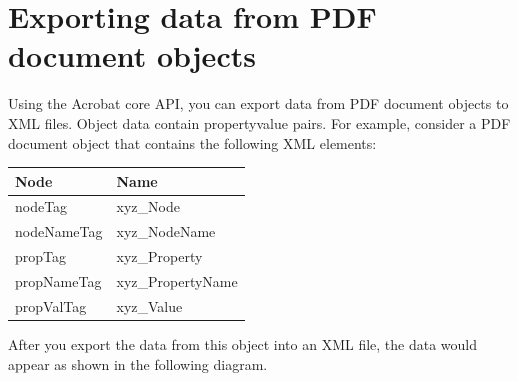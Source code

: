 \documentclass[letterpaper,12pt,english,openany,oneside]{sphinxmanual}
\begin{document}
\section{Exporting data from PDF document objects}
\label{\detokenize{Plugins_Pimech:exporting-data-from-pdf-document-objects}}
Using the Acrobat core API, you can export data from PDF document objects to XML files. Object data contain property\sphinxhyphen{}value pairs. For example, consider a PDF document object that contains the following XML elements:


\begin{savenotes}\sphinxattablestart
\centering
{}\label{\detokenize{Plugins_Pimech:section-1}}\nobreak
\begin{tabulary}{\linewidth}[t]{|T|T|}
\hline
\sphinxstyletheadfamily 
Node
&\sphinxstyletheadfamily 
Name
\\
\hline
nodeTag
&
xyz\_Node
\\
\hline
nodeNameTag
&
xyz\_NodeName
\\
\hline
propTag
&
xyz\_Property
\\
\hline
propNameTag
&
xyz\_PropertyName
\\
\hline
propValTag
&
xyz\_Value
\\
\hline
\end{tabulary}
\par
\sphinxattableend\end{savenotes}

After you export the data from this object into an XML file, the data would appear as shown in the following diagram.

\noindent{}
\end{document}
